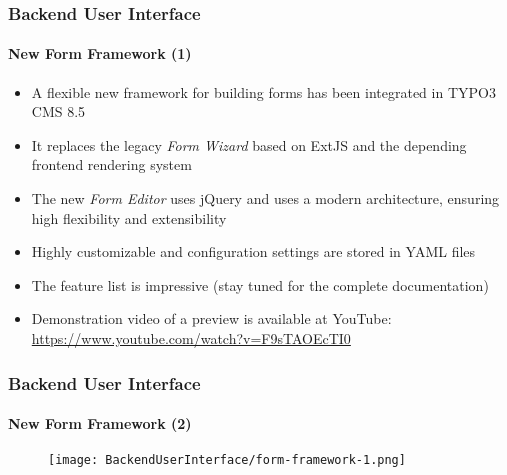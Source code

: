 \begin{frame}[fragile]
	\frametitle{Backend User Interface}
	\framesubtitle{New Form Framework (1)}

	\begin{itemize}
		\item A flexible new framework for building forms has been integrated in TYPO3 CMS 8.5
		\item It replaces the legacy \textit{Form Wizard} based on ExtJS and the depending frontend rendering system
		\item The new \textit{Form Editor} uses jQuery and uses a modern architecture,
			ensuring high flexibility and extensibility
		\item Highly customizable and configuration settings are stored in YAML files
		\item The feature list is impressive\newline
			\small(stay tuned for the complete documentation)\normalsize
		\item Demonstration video of a preview is available at YouTube:\newline
			\url{https://www.youtube.com/watch?v=F9sTAOEcTI0}
	\end{itemize}

\end{frame}
\begin{frame}[fragile]
	\frametitle{Backend User Interface}
	\framesubtitle{New Form Framework (2)}

	\begin{figure}
		\texttt{[image: BackendUserInterface/form-framework-1.png]}
	\end{figure}

\end{frame}

